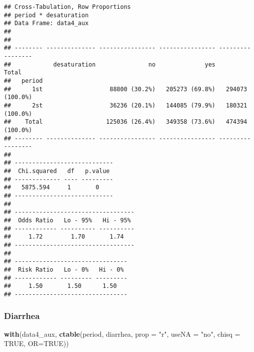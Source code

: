 \documentclass[
]{article}
\newenvironment{Shaded}{\begin{snugshade}}{\end{snugshade}}
\newcommand{\DataTypeTok}[1]{\textcolor[rgb]{0.13,0.29,0.53}{#1}}
\newcommand{\KeywordTok}[1]{\textcolor[rgb]{0.13,0.29,0.53}{\textbf{#1}}}
\newcommand{\NormalTok}[1]{#1}
\newcommand{\OtherTok}[1]{\textcolor[rgb]{0.56,0.35,0.01}{#1}}
\newcommand{\StringTok}[1]{\textcolor[rgb]{0.31,0.60,0.02}{#1}}
\begin{document}
\begin{verbatim}
## Cross-Tabulation, Row Proportions  
## period * desaturation  
## Data Frame: data4_aux  
## 
## 
## -------- -------------- ---------------- ---------------- -----------------
##            desaturation               no              yes             Total
##   period                                                                   
##      1st                   88800 (30.2%)   205273 (69.8%)   294073 (100.0%)
##      2st                   36236 (20.1%)   144085 (79.9%)   180321 (100.0%)
##    Total                  125036 (26.4%)   349358 (73.6%)   474394 (100.0%)
## -------- -------------- ---------------- ---------------- -----------------
## 
## ----------------------------
##  Chi.squared   df   p.value 
## ------------- ---- ---------
##   5875.594     1       0    
## ----------------------------
## 
## ----------------------------------
##  Odds Ratio   Lo - 95%   Hi - 95% 
## ------------ ---------- ----------
##     1.72        1.70       1.74   
## ----------------------------------
## 
## --------------------------------
##  Risk Ratio   Lo - 0%   Hi - 0% 
## ------------ --------- ---------
##     1.50       1.50      1.50   
## --------------------------------
\end{verbatim}

\hypertarget{diarrhea-1}{%
\subsubsection{Diarrhea}\label{diarrhea-1}}

\begin{Shaded}
\begin{Highlighting}[]
\KeywordTok{with}\NormalTok{(data4_aux, }\KeywordTok{ctable}\NormalTok{(period, diarrhea, }\DataTypeTok{prop =} \StringTok{"r"}\NormalTok{, }\DataTypeTok{useNA =} \StringTok{"no"}\NormalTok{, }\DataTypeTok{chisq =} \OtherTok{TRUE}\NormalTok{, }\DataTypeTok{OR=}\OtherTok{TRUE}\NormalTok{))}
\end{Highlighting}
\end{Shaded}
\end{document}
